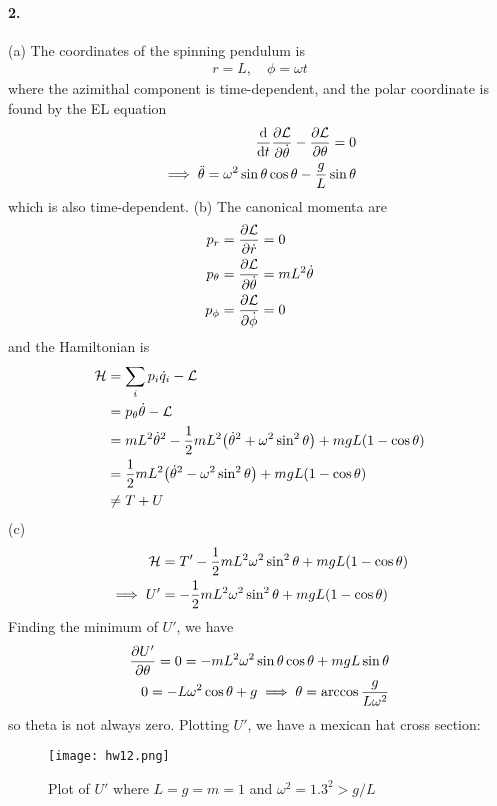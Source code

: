 \documentclass[../hw.tex]{subfiles}
\begin{document}
\paragraph*{2.} (a) The coordinates of the spinning pendulum is 
\begin{align*}
    r = L, \quad \phi = \omega t 
\end{align*}
where the azimithal component is time-dependent, and the polar coordinate is found by the EL equation
\begin{align*}
    \dv{t} \pdv{\mathcal{L}}{\dot \theta} - \pdv{\mathcal{L}}{\theta} = 0 \\
    \implies \ddot \theta = \omega^2 \sin \theta \cos \theta - \frac{g}{L} \sin \theta 
\end{align*}
which is also time-dependent. (b) The canonical momenta are
\begin{align*}
    p_r &= \pdv{\mathcal{L}}{\dot r} = 0 \\
    p_\theta &= \pdv{\mathcal{L}}{\dot \theta} = m L^2 \dot \theta \\
    p_\phi &= \pdv{\mathcal{L}}{\dot \phi} = 0
\end{align*}
and the Hamiltonian is
\begin{align*}
    \ham &= \sum_i p_i \dot q_i - \lagr \\
    &= p_\theta \dot \theta - \lagr \\
    &= m L^2 \dot \theta^2 
        - \frac{1}{2} m L^2 \qt(\dot \theta^2 + \omega^2 \sin^2 \theta) 
        + m g L(1 - \cos \theta) \\
    &= \frac{1}{2} m L^2 \qt(\dot \theta^2 - \omega^2 \sin^2 \theta) + m g L(1 - \cos \theta) \\
    &\neq T + U
\end{align*}
(c)
\begin{align*}
    \mathcal{H} &= T' - \frac{1}{2} mL^2 \omega^2 \sin^2\theta + m g L(1 - \cos\theta) \\
    \implies U' &= -\frac{1}{2} mL^2 \omega^2 \sin^2\theta + m g L(1 - \cos\theta)
\end{align*}
Finding the minimum of $U'$, we have
\begin{align*}
    \pdv{U'}{\theta} = 0 = -mL^2 \omega^2 \sin\theta \cos\theta + mgL \sin\theta \\
    0 = -L \omega^2 \cos\theta + g 
    \implies \theta = \arccos \frac{g}{L \omega^2}
\end{align*}
so theta is not always zero. Plotting $U'$, we have a mexican hat cross section:
\begin{figure}[ht]
    \centering
    \texttt{[image: hw12.png]}
    \caption{Plot of $U'$ where $L = g = m = 1$ and $\omega^2 = 1.3^2 > g/L$}
\end{figure}
\end{document}
